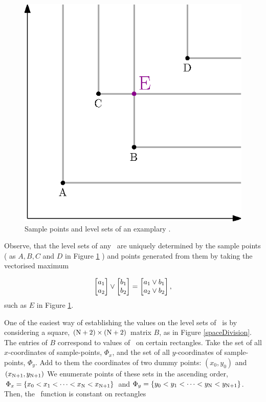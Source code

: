 \documentclass{book}
\begin{document}
\begin{figure}
	\centering \includegraphics[scale=1]{./img/KS1.eps}
	\caption{Sample points and level sets of an examplary \ecdf.}\label{simpleEcdf}
\end{figure}


Observe, that the level sets of any \ecdf\, are uniquely determined by the sample points ( as $A, B, C$ and $D$ in Figure \ref{simpleEcdf} ) and points generated from them by taking the vectorised maximum

$$ 
	\begin{bmatrix} a_1 \cr a_2 \end{bmatrix} \vee 
	\begin{bmatrix} b_1 \cr b_2 \end{bmatrix} = 
	\begin{bmatrix} a_1 \vee b_1 \cr a_2 \vee b_2 \end{bmatrix},
$$ 
such as $E$ in Figure \ref{simpleEcdf}.  

One of the easiest way of establishing the values on the level sets of \Fecdf\, is by considering a square, $(\mathrm{N}+2)\times(\mathrm{N}+2)$ matrix $B$, as in Figure \ref{spaceDivision}. The entries of $B$ correspond to values of \Fecdf\, on certain rectangles. Take the set of all $x$-coordinates of sample-points, $\Phi_x$, and the set of all $y$-coordinates of sample-points, $\Phi_y$. Add to them the coordinates of two dummy points: $(x_0, y_0)$ and $(x_{\mathrm{N}+1}, y_{\mathrm{N}+1})$ We enumerate points of these sets in the ascending order, $\Phi_x = \{ x_0 < x_1 < \dots <x_{\mathrm{N}} < x_{\mathrm{N}+1} \}$ and $\Phi_y = \{ y_0 < y_1 < \dots <y_{\mathrm{N}} < y_{\mathrm{N}+1} \}$. Then, the \Fecdf\, function is constant on rectangles 
\end{document}
